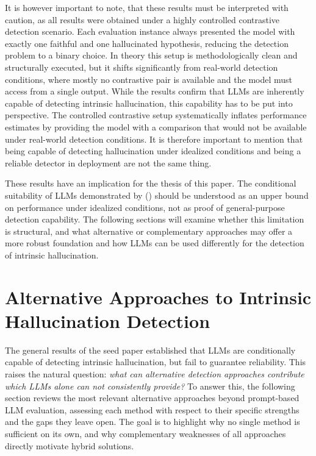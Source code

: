 \documentclass[
  seminar,   	 
  english,   	 
  titlepage=on,
  captions=tableheadings
]{ttlab-qualify}
\begin{document}
It is however important to note, that these results must be interpreted with caution, as all results were obtained under a highly controlled contrastive detection scenario. Each evaluation instance always presented the model with exactly one faithful and one hallucinated hypothesis, reducing the detection problem to a binary choice. In theory this setup is methodologically clean and structurally executed, but it shifts significantly from real-world detection conditions, where mostly no contrastive pair is available and the model must access from a single output. While the results confirm that LLMs are inherently capable of detecting intrinsic hallucination, this capability has to be put into perspective. The controlled contrastive setup systematically inflates performance estimates by providing the model with a comparison that would not be available under real-world detection conditions. It is therefore important to mention that being capable of detecting hallucination under idealized conditions and being a reliable detector in deployment are not the same thing.

These results have an implication for the thesis of this paper. The conditional suitability of LLMs demonstrated by (\cite{Gogoulou2025LLMHallucinationDetection}) should be understood as an upper bound on performance under idealized conditions, not as proof of general-purpose detection capability. The following sections will examine whether this limitation is structural, and what alternative or complementary approaches may offer a more robust foundation and how LLMs can be used differently for the detection of intrinsic hallucination.

\section{Alternative Approaches to Intrinsic Hallucination Detection}
\label{sec:approaches}
The general results of the seed paper established that LLMs are conditionally capable of detecting intrinsic hallucination, but fail to guarantee reliability. This raises the natural question: \textit{what can alternative detection approaches contribute which LLMs alone can not consistently provide?} To answer this, the following section reviews the most relevant alternative approaches beyond prompt-based LLM evaluation, assessing each method with respect to their specific strengths and the gaps they leave open. The goal is to highlight why no single method is sufficient on its own, and why complementary weaknesses of all approaches directly motivate hybrid solutions.
\end{document}
